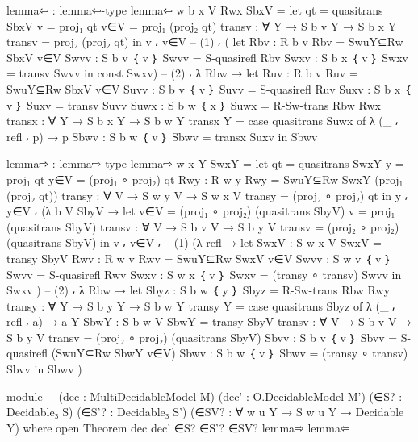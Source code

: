 \begin{spverbatim}
  lemma⇦ : lemma⇦-type
  lemma⇦ {w} {b} {x} {V} Rwx SbxV =
    let
      qt = quasitrans SbxV
      v = proj₁ qt
      v∈V = proj₁ (proj₂ qt)
      transv : ∀ {Y} → S b v Y → S b x Y
      transv = proj₂ (proj₂ qt)
    in v ⸴ v∈V
      -- (1)
      ⸴ (
      let
        Rbv : R b v
        Rbv = SwuY⊆Rw SbxV v∈V
        Swvv : S b v ｛ v ｝
        Swvv = S-quasirefl Rbv
        Swxv : S b x ｛ v ｝
        Swxv = transv Swvv
        in const Swxv)
      -- (2)
      ⸴ λ { Rbw →
        let
          Ruv : R b v
          Ruv = SwuY⊆Rw SbxV v∈V
          Suvv : S b v ｛ v ｝
          Suvv = S-quasirefl Ruv
          Suxv : S b x ｛ v ｝
          Suxv = transv Suvv
          Suwx : S b w ｛ x ｝
          Suwx = R-Sw-trans Rbw Rwx
          transx : ∀ {Y} → S b x Y → S b w Y
          transx {Y} = case quasitrans Suwx of
            λ { (_ ⸴ refl ⸴ p) → p}
          Sbwv : S b w ｛ v ｝
          Sbwv = transx Suxv
        in Sbwv}

  lemma⇨ : lemma⇨-type
  lemma⇨ {w} {x} {Y} SwxY =
    let
      qt = quasitrans SwxY
      y = proj₁ qt
      y∈V = (proj₁ ∘ proj₂) qt
      Rwy : R w y
      Rwy = SwuY⊆Rw SwxY (proj₁ (proj₂ qt))
      transy : ∀ {V} → S w y V → S w x V
      transy = (proj₂ ∘ proj₂) qt
    in y ⸴ y∈V ⸴
      (λ {b} {V} SbyV →
    let v∈V = (proj₁ ∘ proj₂) (quasitrans SbyV)
        v = proj₁ (quasitrans SbyV)
        transv : ∀ {V} → S b v V → S b y V
        transv = (proj₂ ∘ proj₂) (quasitrans SbyV)
    in v ⸴ v∈V ⸴
      -- (1)
      (λ {refl →
        let
            SwxV : S w x V
            SwxV = transy SbyV
            Rwv : R w v
            Rwv = SwuY⊆Rw SwxV v∈V
            Swvv : S w v ｛ v ｝
            Swvv = S-quasirefl Rwv
            Swxv : S w x ｛ v ｝
            Swxv = (transy ∘ transv) Swvv
        in Swxv
        })
      -- (2)
      ⸴ λ { Rbw →
        let
          Sbyz : S b w ｛ y ｝
          Sbyz = R-Sw-trans Rbw Rwy
          transy : ∀ {Y} → S b y Y → S b w Y
          transy {Y} = case quasitrans Sbyz of
            λ { (_ ⸴ refl ⸴ a) → a {Y}  }
          SbwY : S b w V
          SbwY = transy SbyV
          transv : ∀ {V} → S b v V → S b y V
          transv = (proj₂ ∘ proj₂) (quasitrans SbyV)
          Sbvv : S b v ｛ v ｝
          Sbvv = S-quasirefl (SwuY⊆Rw SbwY v∈V)
          Sbwv : S b w ｛ v ｝
          Sbwv = (transy ∘ transv) Sbvv
        in Sbwv
      })

  module _
    (dec : MultiDecidableModel M)
    (dec' : O.DecidableModel M')
    (∈S? : Decidable₃ S)
    (∈S'? : Decidable₃ S')
    (∈SV? : ∀ {w u Y} → S w u Y → Decidable Y)
    where
    open Theorem dec dec' ∈S? ∈S'? ∈SV? lemma⇨ lemma⇦


\end{spverbatim}
